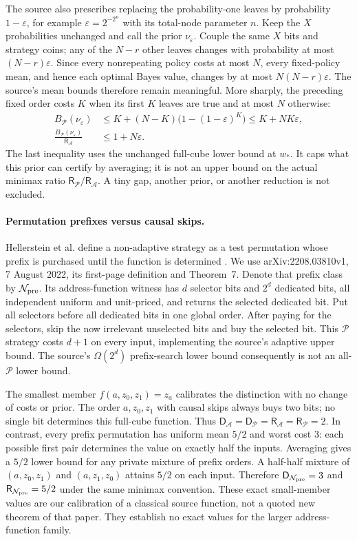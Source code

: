 \documentclass[pdflatex,sn-mathphys-num]{sn-jnl}
\newcommand{\DR}{\mathsf{D}}
\newcommand{\RR}{\mathsf{R}}
\theoremstyle{thmstyleone}
\theoremstyle{thmstylethree}
\theoremstyle{thmstyletwo}
\begin{document}
The source also prescribes replacing the probability-one leaves by
probability $1-\varepsilon$, for example
$\varepsilon=2^{-2^n}$ with its total-node parameter $n$.
Keep the $X$ probabilities unchanged and call the prior
$\nu_\varepsilon$. Couple the same $X$ bits and strategy coins;
any of the $N-r$ other leaves changes with probability at most
$(N-r)\varepsilon$. Since every nonrepeating policy costs at most
$N$, every fixed-policy mean, and hence each optimal Bayes value,
changes by at most $N(N-r)\varepsilon$. The source's mean bounds
therefore remain meaningful. More sharply, the preceding fixed order
costs $K$ when its first $K$ leaves are true and at most $N$ otherwise:
\[
 \begin{split}
 B_{\mathcal P}(\nu_\varepsilon)
 &\leq K+(N-K)\bigl(1-(1-\varepsilon)^K\bigr)
 \leq K+NK\varepsilon,\\
 \frac{B_{\mathcal P}(\nu_\varepsilon)}{\RR_{\mathcal A}}
 &\leq1+N\varepsilon.
 \end{split}
\]
The last inequality uses the unchanged full-cube lower bound at $w_*$.
It caps what this prior can certify by averaging; it is not an upper
bound on the actual minimax ratio $\RR_{\mathcal P}/\RR_{\mathcal A}$.
A tiny gap, another prior, or another reduction is not excluded.

\paragraph*{Permutation prefixes versus causal skips.}
Hellerstein et al. define a non-adaptive strategy as a test permutation
whose prefix is purchased until the function is determined
\cite{hellerstein2022adaptivity}. We use arXiv:2208.03810v1,
7 August 2022, its first-page definition and Theorem~7. Denote that
prefix class by $\mathcal N_{\rm pre}$. Its address-function witness
has $d$ selector bits and $2^d$ dedicated bits, all independent uniform
and unit-priced, and returns the selected dedicated bit. Put all
selectors before all dedicated bits in one global order. After paying
for the selectors, skip the now irrelevant unselected bits and buy
the selected bit. This $\mathcal P$ strategy costs $d+1$ on every
input, implementing the source's adaptive upper bound. The source's
$\Omega(2^d)$ prefix-search lower bound consequently is not an
all-$\mathcal P$ lower bound.

The smallest member $f(a,z_0,z_1)=z_a$ calibrates the distinction with
no change of costs or prior. The order $a,z_0,z_1$ with causal skips
always buys two bits; no single bit determines this full-cube
function. Thus $\DR_{\mathcal A}=\DR_{\mathcal P}
=\RR_{\mathcal A}=\RR_{\mathcal P}=2$.
In contrast, every prefix permutation has uniform mean $5/2$ and
worst cost $3$: each possible first pair determines the value on
exactly half the inputs. Averaging gives a $5/2$ lower bound for any
private mixture of prefix orders. A half-half mixture of
$(a,z_0,z_1)$ and $(a,z_1,z_0)$ attains $5/2$ on each input.
Therefore $\DR_{\mathcal N_{\rm pre}}=3$ and
$\RR_{\mathcal N_{\rm pre}}=5/2$ under the same minimax convention.
These exact small-member values are our calibration of a classical
source function, not a quoted new theorem of that paper. They
establish no exact values for the larger address-function family.
\end{document}
